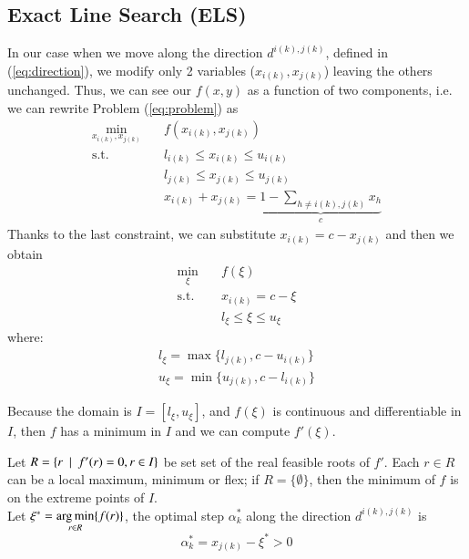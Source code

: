 \subsection{Exact Line Search (ELS)}
In our case when we move along the direction $d^{i(k),j(k)}$, defined in (\ref{eq:direction}), we modify only 2 variables ($x_{i(k)}, x_{j(k)}$) leaving the others unchanged. Thus, we can see our $f(x,y)$ as a function of two components, i.e. we can rewrite Problem (\ref{eq:problem}) as
\begin{subequations}\label{eq:twocomp} 
\begin{align}
\min_{x_{i(k)}, x_{j(k)}} & \quad f(x_{i(k)}, x_{j(k)})  \\
\text{s.t.} & \quad l_{i(k)} \leq x_{i(k)}  \leq u_{i(k)} \\
& \quad l_{j(k)} \leq x_{j(k)}  \leq u_{j(k)} \\
& \quad x_{i(k)}+x_{j(k)} = \underbrace{1-\sum_{h\ne {i(k)},{j(k)}}x_h}_c
\end{align}
\end{subequations}
Thanks to the last constraint, we can substitute $x_{i(k)} = c - x_{j(k)}$ and then we obtain
\begin{subequations}\label{eq:onecomp} 
\begin{align}
\min_{\xi} & \quad f(\xi) \\
\text{s.t.} & \quad x_{i(k)} = c - \xi \\
& \quad l_{\xi} \leq \xi \leq u_{\xi}
\end{align}
\end{subequations}
where:
\begin{equation}
\begin{aligned}
 l_{\xi} = \max\{l_{j(k)}, c - u_{i(k)}\}\\
 u_{\xi}= \min \{ u_{j(k)}, c-l_{i(k)}\}  
 \end{aligned}
\end{equation}

Because the domain is $I=[l_{\xi}, u_{\xi}]$, and $f(\xi)$ is continuous and differentiable in $I$, then $f$ has a minimum in $I$ and we can compute $f'(\xi)$. 

Let $R = \{ r \enskip | \enskip f'(r) = 0, r \in I \}$ be set set of the real feasible roots of $f'$. Each $r \in R$ can be a local maximum, minimum or flex; if $R = \{ \emptyset \}$, then the minimum of $f$ is on the extreme points of $I$.\\ 
Let $\xi^* =\displaystyle \operatorname*{arg\,min}_{r \in R}\{ f(r)\}$, the optimal step $\alpha_k^*$ along the direction $d^{i(k),j(k)}$ is
\begin{equation}
\alpha_k^* = x_{j(k)} - \xi^* > 0
\end{equation} 
